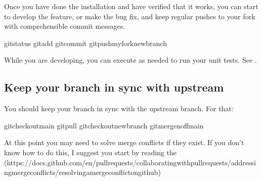 \documentclass[letterpaper,10pt,english,openany,oneside]{sphinxmanual}
\begin{document}
\sphinxAtStartPar
Once you have done the installation and have verified that it works,
you can start to develop the feature, or make the bug fix, and keep
regular pushes to your fork with comprehensible commit messages.

\begin{sphinxVerbatim}[commandchars=\\\{\}]
gitstatus
gitadd
gitcommit
gitpushmyforknew\PYGZus{}branch
\end{sphinxVerbatim}

\sphinxAtStartPar
While you are developing, you can execute  as needed to run
your unit tests. See {\hyperref[\detokenize{docs/guide-chapter-contributing:run-unit-tests-with-pytest}]{}}.


\subsection{Keep your branch in sync with upstream}
\label{\detokenize{docs/guide-chapter-contributing:keep-your-branch-in-sync-with-upstream}}
\sphinxAtStartPar
You should keep your branch in sync with the upstream 
branch. For that:

\begin{sphinxVerbatim}[commandchars=\\\{\}]
gitcheckoutmain
gitpull
gitcheckoutnew\PYGZus{}branch
gitmerge\PYGZhy{}\PYGZhy{}no\PYGZhy{}ffmain
\end{sphinxVerbatim}

\sphinxAtStartPar
At this point you may need to solve merge conflicts if they exist. If you don’t
know how to do this, I suggest you start by reading the  (https://docs.github.com/en/pull\sphinxhyphen{}requests/collaborating\sphinxhyphen{}with\sphinxhyphen{}pull\sphinxhyphen{}requests/addressing\sphinxhyphen{}merge\sphinxhyphen{}conflicts/resolving\sphinxhyphen{}a\sphinxhyphen{}merge\sphinxhyphen{}conflict\sphinxhyphen{}on\sphinxhyphen{}github)
\end{document}

